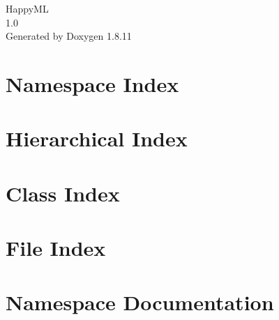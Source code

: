\documentclass[twoside]{book}
\newcommand{\+}{\discretionary{\mbox{\scriptsize$\hookleftarrow$}}{}{}}
\newcommand{\clearemptydoublepage}{%
  \newpage{\pagestyle{empty}\cleardoublepage}%
}
\begin{document}
\hypersetup{pageanchor=false,
             bookmarksnumbered=true,
             pdfencoding=unicode
            }
\begin{titlepage}
\vspace*{7cm}
\begin{center}%
{\Large Happy\+ML \\[1ex]\large 1.\+0 }\\
\vspace*{1cm}
{\large Generated by Doxygen 1.8.11}\\
\end{center}
\end{titlepage}
\clearemptydoublepage
\tableofcontents
\clearemptydoublepage
{}
\hypersetup{pageanchor=true}

\chapter{Namespace Index}

\chapter{Hierarchical Index}

\chapter{Class Index}

\chapter{File Index}

\chapter{Namespace Documentation}




\end{document}
